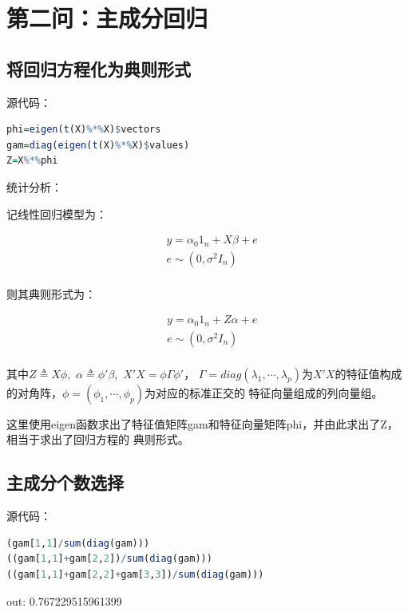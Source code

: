 \documentclass[a4paper,12pt]{article}
\begin{document}
\section{第二问：主成分回归}

\subsection{将回归方程化为典则形式}

源代码：

\begin{lstlisting}[language=r,breaklines]
phi=eigen(t(X)%*%X)$vectors
gam=diag(eigen(t(X)%*%X)$values)
Z=X%*%phi
\end{lstlisting}

统计分析：

记线性回归模型为：

\begin{equation*}
	\begin{aligned}
		& y=\alpha_0 1_n+X\beta+e\\
		& e\sim (0,\sigma^2 I_n)\\
	\end{aligned}
\end{equation*}

则其典则形式为：

\begin{equation*}
	\begin{aligned}
		& y=\alpha_0 1_n+Z\alpha+e\\
		& e\sim (0,\sigma^2 I_n)\\
	\end{aligned}
\end{equation*}

其中$Z \triangleq X\phi$,\ $\alpha \triangleq \phi'\beta$,\ $X'X=\phi\Gamma\phi'$，
$\Gamma=diag(\lambda_1,\cdots,\lambda_p)$为$X'X$的特征值构成的对角阵，$\phi=(\phi_1,\cdots,\phi_p)$为对应的标准正交的
特征向量组成的列向量组。

这里使用eigen函数求出了特征值矩阵gam和特征向量矩阵phi，并由此求出了Z，相当于求出了回归方程的
典则形式。

\subsection{主成分个数选择}

源代码：

\begin{lstlisting}[language=r,breaklines]
(gam[1,1]/sum(diag(gam)))
((gam[1,1]+gam[2,2])/sum(diag(gam)))
((gam[1,1]+gam[2,2]+gam[3,3])/sum(diag(gam)))
\end{lstlisting}
out: 0.767229515961399 
\end{document}
